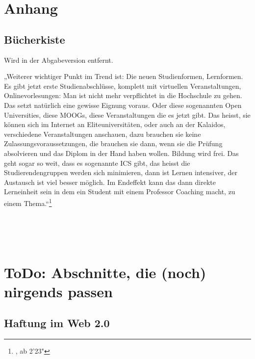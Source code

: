 \appendix
\section{Anhang} %
\label{sec:anhang}

\subsection{Bücherkiste} %
\label{sub:bucherkiste}

Wird in der Abgabeversion entfernt.

„Weiterer wichtiger Punkt im Trend ist: Die neuen Studienformen, Lernformen. Es gibt jetzt erste Studienabschlüsse, komplett mit virtuellen Veranstaltungen, Onlinevorlesungen: Man ist nicht mehr verpflichtet in die Hochschule zu gehen. Das setzt natürlich eine gewisse Eignung voraus. Oder diese sogenannten Open Universities, diese MOOGs, diese Veranstaltungen die es jetzt gibt. Das heisst, sie können sich im Internet an Eliteuniversitäten, oder auch an der Kalaidos, verschiedene Veranstaltungen anschauen, dazu brauchen sie keine Zulassungsvoraussetzungen, die brauchen sie dann, wenn sie die Prüfung absolvieren und das Diplom in der Hand haben wollen. Bildung wird frei. Das geht sogar so weit, dass es sogenannte ICS gibt, das heisst die Studierendengruppen werden sich minimieren, dann ist Lernen intensiver, der Austausch ist viel besser möglich. Im Endeffekt kann das dann direkte Lerneinheit sein in dem  ein Student mit einem Professor Coaching macht, zu einem Thema.“\footnote{\cite{roegner:trends}, ab 2'23"}

\cite{meggle}\\
\cite{ojstersek}\\
\cite{schulmeister}\\



\section{ToDo: Abschnitte, die (noch) nirgends passen} %
\label{sec:noch_ein_anhang}


\subsection{Haftung im Web 2.0} %
\label{sub:haftung_im_web_2_0}





